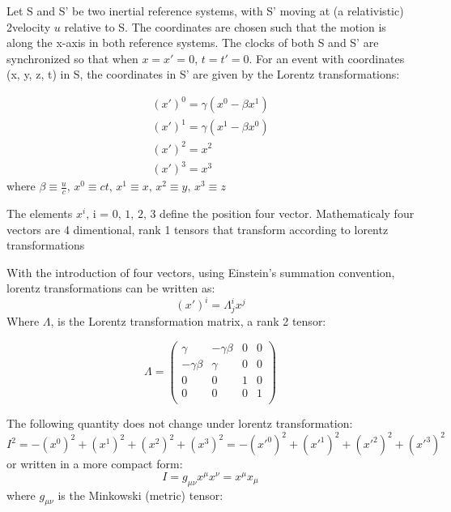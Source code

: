 Let S and S' be two inertial reference systems, with S' moving at (a relativistic) 2velocity \(u\) relative to S. The coordinates are chosen such that the motion is along the x-axis in both reference systems. The clocks of both S and S' are synchronized so that when \(x = x' = 0\), \(t = t' = 0\).
For an event with coordinates (x, y, z, t) in S, the coordinates in S' are given by the Lorentz transformations:

\begin{equation}
\begin{matrix}
(x')^{0} = \gamma(x^{0} - \beta x^{1}) \\
(x')^{1} = \gamma(x^{1} - \beta x^{0}) \\
(x')^{2} = x^{2} \\
(x')^{3} = x^{3}
\end{matrix}
\end{equation}
where \(\beta \equiv \frac{u}{c}\text{,   } x^{0}\equiv ct\text{,    } x^{1}\equiv x\text{,   } x^{2}\equiv y\text{,   } x^{3}\equiv z\)

The elements \(x^{i}\text{, i = 0, 1, 2, 3}\) define the position four vector. Mathematicaly four vectors are 4 dimentional, rank 1 tensors that transform according to lorentz transformations

With the introduction of four vectors, using Einstein's summation convention, lorentz transformations can be written as:
\begin{equation}
(x')^{i} = \Lambda^{i}_{j}x^{j}
\end{equation}
Where \(\Lambda\), is the Lorentz transformation matrix, a rank 2 tensor:

\begin{equation}
\Lambda = \begin{pmatrix}
 \gamma & -\gamma \beta &  0 & 0 \\
  -\gamma \beta & \gamma &   0 & 0 \\
  0 & 0& 1 &0\\
  0 & 0& 0 &1\\
  \end{pmatrix}
  \end{equation}

The following quantity does not change under lorentz transformation:
\begin{equation}
I^{2} = -(x^{0})^{2} + (x^{1})^{2} + (x^{2})^{2} +(x^{3})^{2} = -(x'^{0})^{2} + (x'^{1})^{2} + (x'^{2})^{2} +(x'^{3})^{2}
\end{equation}
or written in a more compact form:
\begin{equation}
I = g_{\mu \nu}x^{\mu}x^{\nu} = x^{\mu}x_{\mu}
\end{equation} 
where \(g_{\mu\nu}\) is the Minkowski (metric) tensor:

